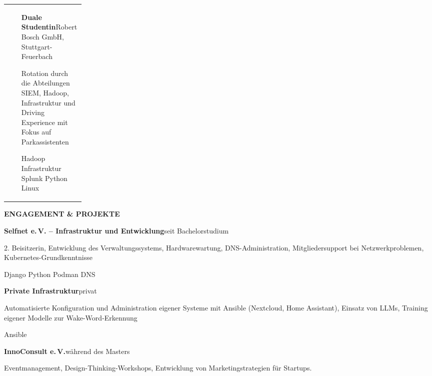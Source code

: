 \documentclass[10pt,a4paper]{article}
\makeatletter
\newcommand{\mainsection}[1]{%
  \vspace{2mm}%
  {\large\bfseries\textcolor{CVPrimary}{\MakeUppercase{#1}}}\par
  \vspace{0.8mm}{\color{CVRule}\rule{\linewidth}{0.6pt}}\vspace{1.2mm}
}
\newcommand{\entry}[4]{%
  \begin{tabularx}{\linewidth}{@{}>{\raggedright\arraybackslash}p{0.18\linewidth}@{\hspace{2.5mm}}X@{}}
    {\small\textcolor{CVMuted}{#1}} &
    {\bfseries #2}\hfill{\small\textcolor{CVMuted}{#3}}\par
    #4
  \end{tabularx}\vspace{1.2mm}
}
\newcommand{\compactentry}[3]{%
  {\bfseries #1}\hfill{\small\textcolor{CVMuted}{#2}}\par
  #3\par\vspace{1.7mm}
}
\newcommand{\tag}[1]{%
  \begingroup
  \setlength{\fboxsep}{1.4pt}%
  \colorbox{CVSoft}{\scriptsize\textcolor{CVPrimary}{#1}}%
  \endgroup\hspace{0.7mm}%
}
\makeatother
\begin{document}
\begin{minipage}[t]{0.68\textwidth}
  \entry{10/2021--09/2024}{Duale Studentin}{Robert Bosch GmbH, Stuttgart-Feuerbach}{
    Rotation durch die Abteilungen SIEM, Hadoop, Infrastruktur und Driving Experience mit Fokus auf
    Parkassistenten\par
    \tag{Hadoop}\tag{Infrastruktur}\tag{Splunk}\tag{Python}\tag{Linux}
  }

  \mainsection{Engagement \& Projekte}

  \compactentry{Selfnet e.\,V. -- Infrastruktur und Entwicklung}{seit Bachelorstudium}{
    2. Beisitzerin, Entwicklung des Verwaltungssystems, Hardwarewartung,
    DNS-Administration, Mitgliedersupport bei Netzwerkproblemen,
    Kubernetes-Grundkenntnisse\par
    \tag{Django}\tag{Python}\tag{Podman}\tag{DNS}
  }

  \compactentry{Private Infrastruktur}{privat}{
    Automatisierte Konfiguration und Administration eigener Systeme mit Ansible
    (Nextcloud, Home Assistant), Einsatz von LLMs, Training eigener
    Modelle zur Wake-Word-Erkennung\par
    \tag{Ansible}
  }

  \compactentry{InnoConsult e.\,V.}{während des Masters}{
    Eventmanagement, Design-Thinking-Workshops, Entwicklung von Marketingstrategien für Startups.
  }
\end{minipage}
\end{document}
